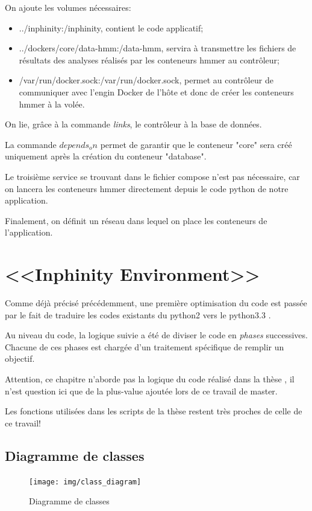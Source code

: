 On ajoute les volumes nécessaires:

\begin{itemize}
\item ../inphinity:/inphinity, contient le code applicatif;
\item ../dockers/core/data-hmm:/data-hmm, servira à transmettre les fichiers de résultats des analyses réalisés par les conteneurs hmmer au contrôleur;
\item /var/run/docker.sock:/var/run/docker.sock, permet au contrôleur de communiquer avec l'engin Docker de l'hôte et donc de créer les conteneurs hmmer à la volée.
\end{itemize}

On lie, grâce à la commande \emph{links}, le contrôleur à la base de données.

La commande \emph{$depends_on$} permet de garantir que le conteneur "core" sera créé uniquement après la création du conteneur "database".

Le troisième service se trouvant dans le fichier compose n'est pas nécessaire, car on lancera les conteneurs hmmer directement depuis le code python de notre application. 

Finalement, on définit un réseau dans lequel on place les conteneurs de l'application.

\section{<<Inphinity Environment>>}

Comme déjà précisé précédemment, une première optimisation du code est passée par le fait de traduire les codes existants du python2 vers le python3.3 .

Au niveau du code, la logique suivie a été de diviser le code en \emph{phases} successives. Chacune de ces phases est chargée d'un traitement spécifique de remplir un objectif.

Attention, ce chapitre n'aborde pas la logique du code réalisé dans la thèse \thLeite , il n'est question ici que de la plus-value ajoutée lors de ce travail de master.

Les fonctions utilisées dans les scripts de la thèse \thLeite restent très proches de celle de ce travail!

\newpage
\subsection{Diagramme de classes}
\begin{figure}[H] 
\centering 
\texttt{[image: img/class\_diagram]} 
\caption[classdiagram]{Diagramme de classes}
\label{fig:classdiagram} 
\end{figure}

